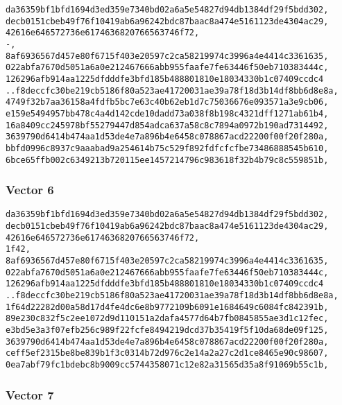 \documentclass[
]{article}
\begin{document}
\begin{verbatim}
da36359bf1bfd1694d3ed359e7340bd02a6a5e54827d94db1384df29f5bdd302,
decb0151cbeb49f76f10419ab6a96242bdc87baac8a474e5161123de4304ac29,
42616e646572736e6174636820766563746f72,
-,
8af6936567d457e80f6715f403e20597c2ca58219974c3996a4e4414c3361635,
022abfa7670d5051a6a0e212467666abb955faafe7fe63446f50eb710383444c,
126296afb914aa1225dfdddfe3bfd185b488801810e18034330b1c07409ccdc4
..f8deccfc30be219cb5186f80a523ae41720031ae39a78f18d3b14df8bb6d8e8a,
4749f32b7aa36158a4fdfb5bc7e63c40b62eb1d7c75036676e093571a3e9cb06,
e159e5494957bb478c4a4d142cde10dadd73a038f8b198c4321dff1271ab61b4,
16a8409cc245978bf55279447d854adca637a58c8c7894a0972b190ad7314492,
3639790d6414b474aa1d53de4e7a896b4e6458c078867acd22200f00f20f280a,
bbfd0996c8937c9aaabad9a254614b75c529f892fdfcfcfbe73486888545b610,
6bce65ffb002c6349213b720115ee1457214796c983618f32b4b79c8c559851b,
\end{verbatim}

\hypertarget{vector-6-1}{%
\subsubsection{Vector 6}\label{vector-6-1}}

\begin{verbatim}
da36359bf1bfd1694d3ed359e7340bd02a6a5e54827d94db1384df29f5bdd302,
decb0151cbeb49f76f10419ab6a96242bdc87baac8a474e5161123de4304ac29,
42616e646572736e6174636820766563746f72,
1f42,
8af6936567d457e80f6715f403e20597c2ca58219974c3996a4e4414c3361635,
022abfa7670d5051a6a0e212467666abb955faafe7fe63446f50eb710383444c,
126296afb914aa1225dfdddfe3bfd185b488801810e18034330b1c07409ccdc4
..f8deccfc30be219cb5186f80a523ae41720031ae39a78f18d3b14df8bb6d8e8a,
1f64d22282d00a58d17d4fe4dc6e8b9772109b6091e1684649c6084fc842391b,
89e230c832f5c2ee1072d9d110151a2dafa4577d64b7fb0845855ae3d1c12fec,
e3bd5e3a3f07efb256c989f22fcfe8494219dcd37b35419f5f10da68de09f125,
3639790d6414b474aa1d53de4e7a896b4e6458c078867acd22200f00f20f280a,
ceff5ef2315be8be839b1f3c0314b72d976c2e14a2a27c2d1ce8465e90c98607,
0ea7abf79fc1bdebc8b9009cc5744358071c12e82a31565d35a8f91069b55c1b,
\end{verbatim}

\hypertarget{vector-7-1}{%
\subsubsection{Vector 7}\label{vector-7-1}}
\end{document}
